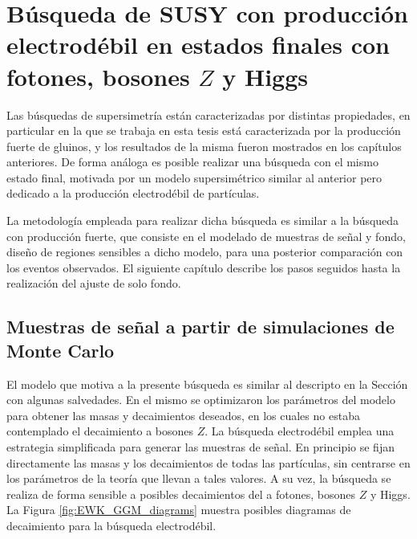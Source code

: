 \chapter{Búsqueda de SUSY con producción electrodébil en estados finales con fotones, bosones $Z$ y Higgs}\label{cap:analysis_EWK}

Las búsquedas de supersimetría están caracterizadas por distintas propiedades, en particular en la que se trabaja en esta tesis está caracterizada por la producción fuerte de gluinos, y los resultados de la misma fueron mostrados en los capítulos anteriores. De forma análoga es posible realizar una búsqueda con el mismo estado final, motivada por un modelo supersimétrico similar al anterior pero dedicado a la producción electrodébil de partículas.

La metodología empleada para realizar dicha búsqueda es similar a la búsqueda con producción fuerte, que consiste en el modelado de muestras de señal y fondo, diseño de regiones sensibles a dicho modelo, para una posterior comparación con los eventos observados. El siguiente capítulo describe los pasos seguidos hasta la realización del ajuste de solo fondo.


\section{Muestras de señal a partir de simulaciones de Monte Carlo}

El modelo que motiva a la presente búsqueda es similar al descripto en la Sección \label{sec:signal_samples} con algunas salvedades. En el mismo se optimizaron los parámetros del modelo para obtener las masas y decaimientos deseados, en los cuales no estaba contemplado el decaimiento a bosones $Z$. La búsqueda electrodébil emplea una estrategia simplificada para generar las muestras de señal. En principio se fijan directamente las masas y los decaimientos de todas las partículas, sin centrarse en los parámetros de la teoría que llevan a tales valores. A su vez, la búsqueda se realiza de forma sensible a posibles decaimientos del \ninoone a fotones, bosones $Z$ y Higgs. La Figura \ref{fig:EWK_GGM_diagrams} muestra posibles diagramas de decaimiento para la búsqueda electrodébil.


